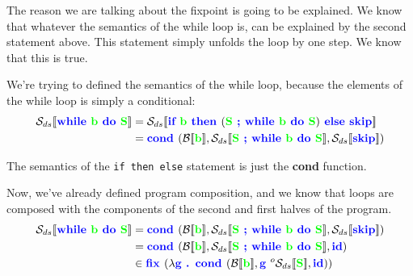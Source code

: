 \documentclass[11pt,a4paper,titlepage,dvipsnames,cmyk]{scrartcl}
\begin{document}
The reason we are talking about the fixpoint is going to be explained. We
know that whatever the semantics of the while loop is, can be explained by
the second statement above. This statement simply unfolds the loop by one
step. We know that this is true.

We're trying to defined the semantics of the while loop, because the
elements of the while loop is simply a conditional:
\begin{align*}
    \mathcal{S}_{ds}[\![ {\color{blue}\textbf{while }} {\color{green}
    \textbf{b }} {\color{blue} \textbf{do }} {\color{green} \textbf{S}}
    ]\!]&=\mathcal{S}_{ds}[\![ {\color{blue} \textbf{if }} {\color{green}
    \textbf{b }} {\color{blue} \textbf{then }} ( {\color{green} \textbf{S
}} {\color{blue} \textbf{; while }} {\color{green} \textbf{b }}
{\color{blue} \textbf{do }} {\color{green} \textbf{S}}) {\color{blue}
\textbf{ else skip}} ]\!] \\
&= {\color{blue} \textbf{cond }}( \mathcal{B}[\![ {\color{green}
\textbf{b}} ]\!] , \mathcal{S}_{ds}[\![ {\color{green} \textbf{S }}
{\color{blue} \textbf{; while }} {\color{green} \textbf{b }} {\color{blue}
\textbf{do }} {\color{green} \textbf{S}} ]\!],
\mathcal{S}_{ds}[\![{\color{blue} \textbf{skip}} ]\!])
\end{align*}

The semantics of the \lstinline|if then else| statement is just the
{\color{blue}\textbf{cond}} function.

Now, we've already defined program composition, and we know that loops are
composed with the components of the second and first halves of the
program.
\begin{align*}
\mathcal{S}_{ds}[\![ {\color{blue}\textbf{while }} {\color{green}
    \textbf{b }} {\color{blue} \textbf{do }} {\color{green} \textbf{S}}
    ]\!] &= {\color{blue} \textbf{cond }}( \mathcal{B}[\![ {\color{green}
\textbf{b}} ]\!] , \mathcal{S}_{ds}[\![ {\color{green} \textbf{S }}
{\color{blue} \textbf{; while }} {\color{green} \textbf{b }} {\color{blue}
\textbf{do }} {\color{green} \textbf{S}} ]\!],
\mathcal{S}_{ds}[\![{\color{blue} \textbf{skip}} ]\!]) \\
&= {\color{blue} \textbf{cond }}( \mathcal{B}[\![ {\color{green}
\textbf{b}} ]\!] , \mathcal{S}_{ds}[\![ {\color{green} \textbf{S }}
{\color{blue} \textbf{; while }} {\color{green} \textbf{b }} {\color{blue}
\textbf{do }} {\color{green} \textbf{S}} ]\!],
{\color{blue} \textbf{id}}) \\
&\in {\color{blue} \textbf{fix }} ( \lambda {\color{blue} \textbf{g . cond
}} ( \mathcal{B} [\![ {\color{green} \textbf{b}} ]\!], {\color{blue}
\textbf{g }} ^o \mathcal{S}_{ds}[\![ {\color{green} \textbf{S}} ]\!],
{\color{blue} \textbf{id}}))
\end{align*}
\end{document}
